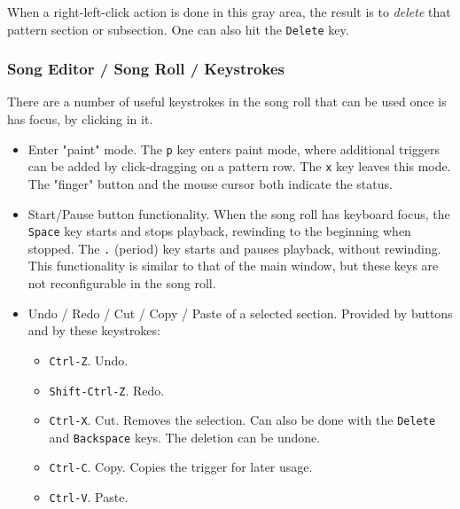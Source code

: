    When a right-left-click action is done in this gray area, the result
   is to \textsl{delete} that pattern section or subsection.
   One can also hit the \texttt{Delete} key.

\subsubsection{Song Editor / Song Roll / Keystrokes}
\label{subsubsec:song_editor_song_roll_keystrokes}

   There are a number of useful keystrokes in the song roll that can be used once
   is has focus, by clicking in it.

   \begin{itemize}
      \item Enter "paint" mode.
         The \texttt{p} key enters paint mode, where additional triggers
         can be added by click-dragging on a pattern row.
         The \texttt{x} key leaves this mode.
         The "finger" button and the mouse cursor both indicate the status.
      \item Start/Pause button functionality.
         When the song roll has keyboard focus,
         the \texttt{Space} key starts and stops playback, rewinding to the
         beginning when stopped.
         The \texttt{.} (period) key starts and pauses playback, without
         rewinding.
         This functionality is similar to that of the main window, but
         these keys are not reconfigurable in the song roll.
      \item Undo / Redo / Cut / Copy / Paste of a selected section.
         Provided by buttons and by these keystrokes:
         \begin{itemize}
            \item \texttt{Ctrl-Z}. Undo.
            \item \texttt{Shift-Ctrl-Z}. Redo.
            \item \texttt{Ctrl-X}. Cut.  Removes the selection.
            Can also be done with the \texttt{Delete} and
            \texttt{Backspace} keys.
            The deletion can be undone.
            \item \texttt{Ctrl-C}. Copy.
            Copies the trigger for later usage.
            \item \texttt{Ctrl-V}. Paste.

\end{itemize}
\end{itemize}
